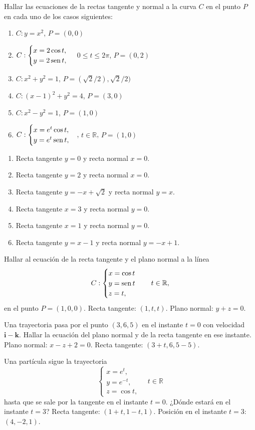 {Hallar las ecuaciones de la rectas tangente y normal a la curva $C$ en el punto $P$ en cada uno de los casos siguientes:
\begin{enumerate}
\item $C: y=x^2$, $P=(0,0)$
\item $C: \begin{cases}
x=2\cos t,\\
y=2\operatorname{sen} t,
\end{cases}
$ $0\leq t\leq 2\pi$, $P=(0,2)$
\item $C:x^2+y^2=1$, $P=(\sqrt{2}/2),\sqrt{2}/2)$
\item $C:(x-1)^2+y^2=4$, $P=(3,0)$
\item $C:x^2-y^2=1$, $P=(1,0)$
\item $C:\begin{cases}
x=e^t\cos t,\\
y=e^t\operatorname{sen} t,
\end{cases}
$, $t\in \mathbb{R}$, $P=(1,0)$
\end{enumerate}
}
{
\begin{enumerate}
\item Recta tangente $y=0$ y recta normal $x=0$.
\item Recta tangente $y=2$ y recta normal $x=0$.
\item Recta tangente $y=-x+\sqrt{2}$ y recta normal $y=x$.
\item Recta tangente $x=3$ y recta normal $y=0$.
\item Recta tangente $x=1$ y recta normal $y=0$.
\item Recta tangente $y=x-1$ y recta normal $y=-x+1$.
\end{enumerate}
}
{
}


{Hallar al ecuación de la recta tangente y el plano normal a la línea
\[
C:
\begin{cases}
x=\cos t \\
y=\operatorname{sen} t\\
z= t,
\end{cases}
\quad t\in \mathbb{R},
\]
en el punto $P=(1,0,0)$.
}
{Recta tangente: $(1,t,t)$. Plano normal: $y+z=0$.
}
{
}


{Una trayectoria pasa por el punto $(3,6,5)$ en el instante $t=0$ con velocidad $\mathbf{i}-\mathbf{k}$.
Hallar la ecuación del plano normal y de la recta tangente en ese instante.
}
{Plano normal: $x-z+2=0$. Recta tangente: $(3+t,6,5-5)$.
}
{
}


{Una partícula sigue la trayectoria
\[
\begin{cases}
x=e^t,\\
y=e^{-t},\\
z=\cos t,
\end{cases}
\quad t\in \mathbb{R}
\]
hasta que se sale por la tangente en el instante $t=0$. ¿Dónde estará en el instante $t=3$?
}
{Recta tangente: $(1+t,1-t,1)$. Posición en el instante $t=3$: $(4,-2,1)$.
}
{
}
